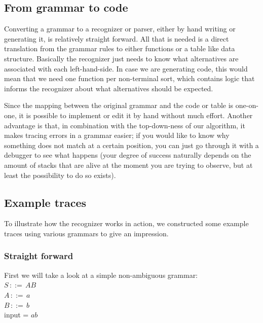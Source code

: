 \documentclass[a4paper,10pt]{article}
\begin{document}
\subsection{From grammar to code}

Converting a grammar to a recognizer or parser, either by hand writing or generating it, is relatively straight forward. All that is needed is a direct translation from the grammar rules to either functions or a table like data structure. Basically the recognizer just needs to know what alternatives are associated with each left-hand-side. In case we are generating code, this would mean that we need one function per non-terminal sort, which contains logic that informs the recognizer about what alternatives should be expected.

Since the mapping between the original grammar and the code or table is one-on-one, it is possible to implement or edit it by hand without much effort. Another advantage is that, in combination with the top-down-ness of our algorithm, it makes tracing errors in a grammar easier; if you would like to know why something does not match at a certain position, you can just go through it with a debugger to see what happens (your degree of success naturally depends on the amount of stacks that are alive at the moment you are trying to observe, but at least the possibility to do so exists).

\subsection{Example traces}

To illustrate how the recognizer works in action, we constructed some example traces using various grammars to give an impression.

\subsubsection{Straight forward}
First we will take a look at a simple non-ambiguous grammar:\\
$S\,::=\,AB$\\
$A\,::=\,a$\\
$B\,::=\,b$\\
input = $ab$
\end{document}
